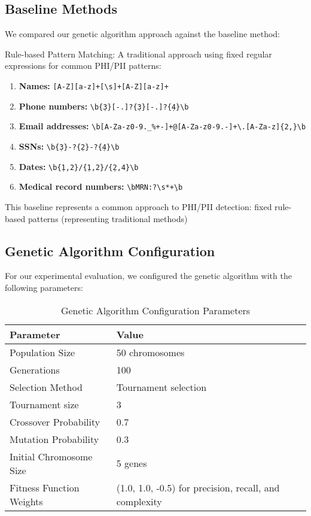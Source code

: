 \documentclass[conference]{IEEEtran}
\begin{document}
\subsection{\textbf{Baseline Methods}}
We compared our genetic algorithm approach against the baseline method:

Rule-based Pattern Matching: A traditional approach using fixed regular expressions for common PHI/PII patterns:
\begin{enumerate}
    \item \textbf{Names:} \texttt{[A-Z][a-z]+[\textbackslash s]+[A-Z][a-z]+}

    \item \textbf{Phone numbers:} \texttt{\textbackslash b\d\{3\}[-.]?\d\{3\}[-.]?\d\{4\}\textbackslash b}

    \item \textbf{Email addresses:} \texttt{\textbackslash b[A-Za-z0-9.\_\%\allowbreak +-]+@[A-Za-z0-9.-]+\textbackslash.[A-Za-z]\allowbreak \{2,\}\textbackslash b}

    \item \textbf{SSNs:} \texttt{\textbackslash b\d\{3\}-?\d\{2\}-?\d\{4\}\textbackslash b}

    \item \textbf{Dates:} \texttt{\textbackslash b\d\{1,2\}/\d\{1,2\}/\d\{2,4\}\textbackslash b}

    \item \textbf{Medical record numbers:} \texttt{\textbackslash bMRN:?\textbackslash s*\d+\textbackslash b}

\end{enumerate}


This baseline represents a common approach to PHI/PII detection: fixed rule-based patterns (representing traditional methods)

\subsection{\textbf{Genetic Algorithm Configuration}}
For our experimental evaluation, we configured the genetic algorithm with the following parameters:
\renewcommand{\arraystretch}{1.4}  %

\begin{table}[htbp]
\caption{Genetic Algorithm Configuration Parameters}
\centering
\begin{tabular}{|l|l|}
\hline
\textbf{Parameter} & \textbf{Value} \\
\hline
Population Size & 50 chromosomes \\
Generations & 100 \\
Selection Method & Tournament selection \\
Tournament size & 3\\
Crossover Probability & 0.7 \\
Mutation Probability & 0.3 \\
Initial Chromosome Size & 5 genes \\
Fitness Function Weights & (1.0, 1.0, -0.5) for precision, recall, and complexity \\
\hline
\end{tabular}
\label{tab:ga_config}
\end{table}
\end{document}
